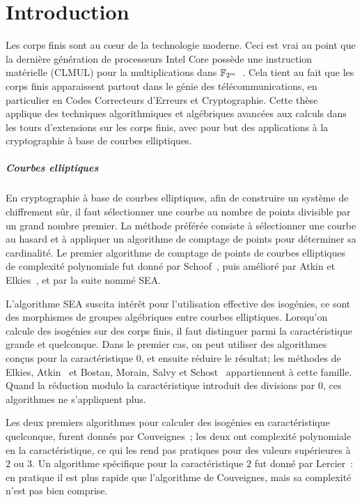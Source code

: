 \chapter*{Introduction}

Les corps finis sont au cœur de la technologie moderne. Ceci est vrai
au point que la dernière génération de processeurs Intel Core possède
une instruction matérielle (CLMUL) pour la multiplications dans
$\mathbb{F}_{2^m}$~\cite{intel-carryless}. Cela tient au fait que les corps
finis apparaissent partout dans le génie des télécommunications, en
particulier en Codes Correcteurs d'Erreurs et Cryptographie. Cette
thèse applique des techniques algorithmiques et algébriques avancées
aux calculs dans les tours d'extensions sur les corps finis, avec pour
but des applications à la cryptographie à base de courbes elliptiques.

\paragraph*{Courbes elliptiques}
En cryptographie à base de courbes elliptiques, afin de construire un
système de chiffrement sûr, il faut sélectionner une courbe au nombre
de points divisible par un grand nombre premier. La méthode préférée
consiste à sélectionner une courbe au hasard et à appliquer un
algorithme de comptage de points pour déterminer sa cardinalité. Le
premier algorithme de comptage de points de courbes elliptiques de
complexité polynomiale fut donné par Schoof~\cite{schoof85}, puis
amélioré par Atkin et Elkies~\cite{atkin88,elkies98,schoof95}, et par
la suite nommé SEA.

L'algorithme SEA suscita intérêt pour l'utilisation effective des
isogénies, ce sont des morphismes de groupes algébriques entre courbes
elliptiques. Lorsqu'on calcule des isogénies sur des corps finis, il
faut distinguer parmi la caractéristique grande et quelconque. Dans le
premier cas, on peut utiliser des algorithmes conçus pour la
caractéristique $0$, et ensuite réduire le résultat; les méthodes de
Elkies\cite{elkies98,morain95}, Atkin~\cite{schoof95} et Bostan,
Morain, Salvy et Schost~\cite{bostan+morain+salvy+schost08}
appartiennent à cette famille. Quand la réduction modulo la
caractéristique introduit des divisions par $0$, ces algorithmes ne
s'appliquent plus.

Les deux premiers algorithmes pour calculer des isogénies en
caractéristique quelconque, furent donnés par
Couveignes~\cite{couveignes94,couveignes96}; les deux ont complexité
polynomiale en la caractéristique, ce qui les rend pas pratiques pour
des valeurs supérieures à $2$ ou $3$. Un algorithme spécifique pour la
caractéristique $2$ fut donné par Lercier~\cite{lercier96}: en
pratique il est plus rapide que l'algorithme de Couveignes, mais sa
complexité n'est pas bien comprise.

